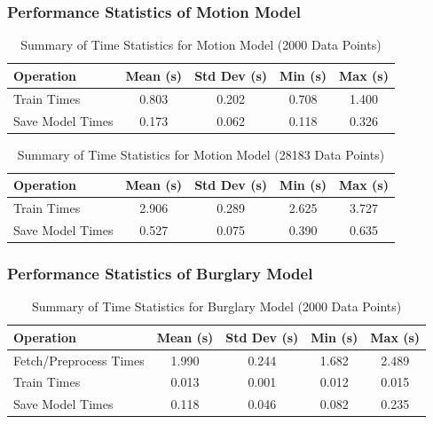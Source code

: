 \documentclass[A4,10pt]{article}
\begin{document}
\subsubsection{Performance Statistics of Motion Model}

\begin{table}[H]
\centering
\begin{tabular}{@{}lcccc@{}}
\toprule
\textbf{Operation} & \textbf{Mean (s)} & \textbf{Std Dev (s)} & \textbf{Min (s)} & \textbf{Max (s)} \\
\midrule
Train Times         & 0.803 & 0.202 & 0.708 & 1.400 \\
Save Model Times    & 0.173 & 0.062 & 0.118 & 0.326 \\
\bottomrule
\end{tabular}
\caption{Summary of Time Statistics for Motion Model (2000 Data Points)}
\label{tab:motion_model_stats_2000}
\end{table}

\begin{table}[H]
\centering
\begin{tabular}{@{}lcccc@{}}
\toprule
\textbf{Operation} & \textbf{Mean (s)} & \textbf{Std Dev (s)} & \textbf{Min (s)} & \textbf{Max (s)} \\
\midrule
Train Times         & 2.906 & 0.289 & 2.625 & 3.727 \\
Save Model Times    & 0.527 & 0.075 & 0.390 & 0.635 \\
\bottomrule
\end{tabular}
\caption{Summary of Time Statistics for Motion Model (28183 Data Points)}
\label{tab:motion_model_stats_28183}
\end{table}

\subsubsection*{Performance Statistics of Burglary Model}

\begin{table}[H]
\centering
\begin{tabular}{@{}lcccc@{}}
\toprule
\textbf{Operation} & \textbf{Mean (s)} & \textbf{Std Dev (s)} & \textbf{Min (s)} & \textbf{Max (s)} \\
\midrule
Fetch/Preprocess Times   & 1.990 & 0.244 & 1.682 & 2.489 \\
Train Times   & 0.013 & 0.001 & 0.012 & 0.015 \\
Save Model Times    & 0.118 & 0.046 & 0.082 & 0.235 \\
\bottomrule
\end{tabular}
\caption{Summary of Time Statistics for Burglary Model (2000 Data Points)}
\label{tab:burglary_model_stats_2000}
\end{table}
\end{document}
